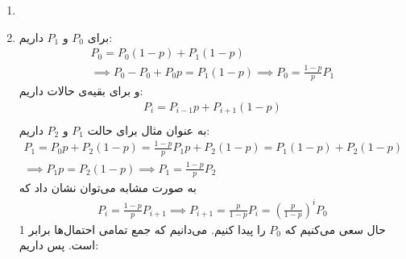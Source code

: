 \begin{enumerate}
    \item \phantom{text} \begin{latin}
        \begin{center}
        \end{center}
    \end{latin}
    \item برای $P_0$ و $P_1$
    داریم:
    \begin{gather*}
        P_0 = P_0 (1 - p) + P_1 (1 - p)\\
        \implies P_0 - P_0 + P_0 p = P_1 (1 - p) \implies P_0 = \frac{1 - p}{p} P_1 
    \end{gather*}
    و برای بقیه‌ی حالات داریم:
    \begin{gather*}
        P_i = P_{i-1} p + P_{i+1} (1 - p)\\
    \end{gather*}
    به عنوان مثال برای حالت
    $P_1$ و $P_2$
    داریم:
    \begin{gather*}
        P_1 = P_{0} p + P_{2} (1 - p) = \frac{1 - p}{p} P_1 p + P_{2} (1 - p) = P_1 (1 - p) + P_{2} (1 - p)\\
        \implies P_1 p = P_{2} (1 - p) \implies P_1 = \frac{1 - p}{p} P_2
    \end{gather*}
    به صورت مشابه می‌توان نشان داد که
    \begin{gather*}
        P_i = \frac{1 - p}{p} P_{i+1} \implies P_{i+1} = \frac{p}{1 - p} P_i = (\frac{p}{1 - p})^{i} P_0
    \end{gather*}
    حال سعی می‌کنیم که
    $P_0$
    را پیدا کنیم. می‌دانیم که جمع تمامی احتمال‌ها برابر 1 است. پس داریم:

\end{enumerate}
